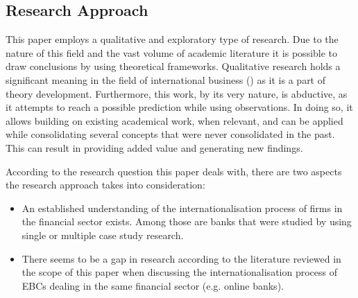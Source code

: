 \documentclass[11pt,a4paper]{article}
\begin{document}
{{\subsection{Research Approach} %
 \par
This paper employs a qualitative and exploratory type of research. Due to the nature of this field and the vast volume of academic literature it is possible to draw conclusions by using theoretical frameworks. Qualitative research holds a significant meaning in the field of international business (\cite{dozQualitativeResearchInternational2011}) as it is a part of theory development. Furthermore, this work, by its very nature, is abductive, as it attempts to reach a possible prediction while using observations. In doing so, it allows building on existing academical work, when relevant, and can be applied while consolidating several concepts that were never consolidated in the past. This can result in providing added value and generating new findings. \par %
According to the research question this paper deals with, there are two aspects the research approach takes into consideration:
\begin{itemize}
 \item {An established understanding of the internationalisation process of firms in the financial sector exists. Among those are banks that were studied by using single or multiple case study research.}
 \item{There seems to be a gap in research according to the literature reviewed in the scope of this paper when discussing the internationalisation process of EBCs dealing in the same financial sector (e.g. online banks). }
\end{itemize}




}}
\end{document}
